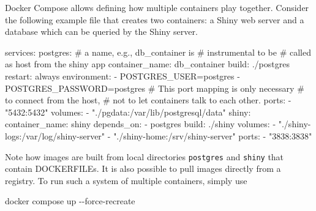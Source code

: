 \documentclass[
  12pt,
  letterpaper,
]{krantz}
\newenvironment{Shaded}{\begin{snugshade}}{\end{snugshade}}
\newcommand{\AttributeTok}[1]{\textcolor[rgb]{0.40,0.45,0.13}{#1}}
\newcommand{\CommentTok}[1]{\textcolor[rgb]{0.37,0.37,0.37}{#1}}
\newcommand{\ExtensionTok}[1]{\textcolor[rgb]{0.00,0.23,0.31}{#1}}
\newcommand{\NormalTok}[1]{\textcolor[rgb]{0.00,0.23,0.31}{#1}}
\newcommand{\StringTok}[1]{\textcolor[rgb]{0.13,0.47,0.30}{#1}}
\begin{document}
Docker Compose allows defining how multiple containers play together.
Consider the following example file that creates two containers: a Shiny
web server and a database which can be queried by the
Shiny server.

\begin{Shaded}
\begin{Highlighting}[]
\ExtensionTok{services:}
   \ExtensionTok{postgres:}
      \CommentTok{\# a name, e.g.,  db\_container is }
      \CommentTok{\# instrumental to be}
      \CommentTok{\# called as host from the shiny app}
      \ExtensionTok{container\_name:}\NormalTok{ db\_container}
      \ExtensionTok{build:}\NormalTok{ ./postgres}
      \ExtensionTok{restart:}\NormalTok{ always}
      \ExtensionTok{environment:}
         \ExtensionTok{{-}}\NormalTok{ POSTGRES\_USER=postgres}
         \ExtensionTok{{-}}\NormalTok{ POSTGRES\_PASSWORD=postgres}
      \CommentTok{\# This port mapping is only necessary }
      \CommentTok{\# to connect from the host, }
      \CommentTok{\# not to let containers talk to each other. }
      \ExtensionTok{ports:}
         \ExtensionTok{{-}} \StringTok{"5432:5432"}
      \ExtensionTok{volumes:}
         \ExtensionTok{{-}} \StringTok{"./pgdata:/var/lib/postgresql/data"}
   \ExtensionTok{shiny:} 
      \ExtensionTok{container\_name:}\NormalTok{ shiny}
      \ExtensionTok{depends\_on:} 
         \ExtensionTok{{-}}\NormalTok{ postgres}
      \ExtensionTok{build:}\NormalTok{ ./shiny}
      \ExtensionTok{volumes:}
         \ExtensionTok{{-}} \StringTok{"./shiny{-}logs:/var/log/shiny{-}server"}
         \ExtensionTok{{-}} \StringTok{"./shiny{-}home:/srv/shiny{-}server"}
      \ExtensionTok{ports:}
         \ExtensionTok{{-}} \StringTok{"3838:3838"}
\end{Highlighting}
\end{Shaded}

Note how images are built from local directories \texttt{postgres} and
\texttt{shiny} that contain DOCKERFILEs. It is also
possible to pull images directly from a registry. To run such a system
of multiple containers, simply use

\begin{Shaded}
\begin{Highlighting}[]
\ExtensionTok{docker}\NormalTok{ compose up }\AttributeTok{{-}{-}force{-}recreate}
\end{Highlighting}
\end{Shaded}
\end{document}
